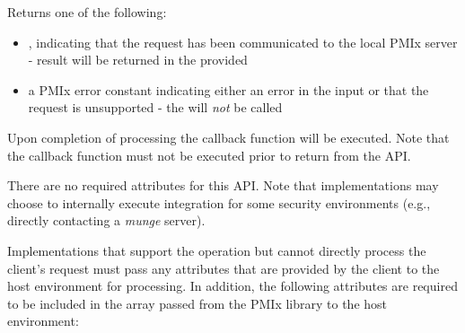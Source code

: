 \format


\begin{arglist}
\end{arglist}

Returns one of the following:

\begin{itemize}
    \item {}, indicating that the request has been communicated to the local \ac{PMIx} server - result will be returned in the provided 
    \item a \ac{PMIx} error constant indicating either an error in the input or that the request is unsupported - the  will \textit{not} be called
\end{itemize}

Upon completion of processing the callback function will be executed. Note that the callback function must not be executed prior to return from the \ac{API}.

\reqattrstart
There are no required attributes for this \ac{API}. Note that implementations may choose to internally
execute integration for some security environments (e.g., directly
contacting a \textit{munge} server).

Implementations that support the operation but cannot directly process the client's request must pass any attributes that are provided by the client to the host environment for processing. In addition, the following attributes are required to be included in the  array passed from the \ac{PMIx} library to the host environment:

